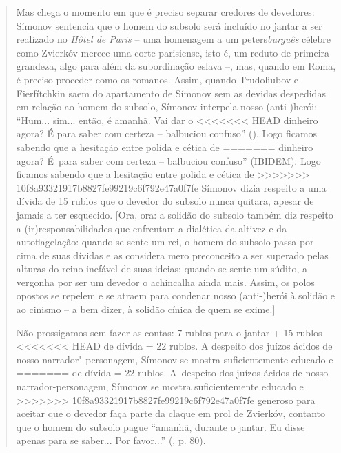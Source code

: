 {\begin{quote}
Mas chega o momento em que é preciso separar credores de devedores:
Símonov sentencia que o homem do subsolo será incluído no jantar a ser
realizado no \emph{Hôtel de Paris} -- uma homenagem a um
peters\emph{burguês} célebre como Zvierkóv merece uma corte parisiense,
isto é, um reduto de primeira grandeza, algo para além da subordinação
eslava --, mas, quando em Roma, é preciso proceder como os romanos.
Assim, quando Trudoliubov e Fierfítchkin saem do apartamento de Símonov
sem as devidas despedidas em relação ao homem do subsolo, Símonov
interpela nosso (anti-)herói: ``Hum... sim... então, é amanhã. Vai dar o
<<<<<<< HEAD
dinheiro agora? É para saber com certeza -- balbuciou confuso''
(). Logo ficamos sabendo que a hesitação entre polida e cética de
=======
dinheiro agora? É~para saber com certeza -- balbuciou confuso''
(IBIDEM). Logo ficamos sabendo que a hesitação entre polida e cética de
>>>>>>> 10f8a93321917b8827fe99219c6f792e47a0f7fe
Símonov dizia respeito a uma dívida de 15 rublos que o devedor do
subsolo nunca quitara, apesar de jamais a ter esquecido. {[}Ora, ora: a
solidão do subsolo também diz respeito a (ir)responsabilidades que
enfrentam a dialética da altivez e da autoflagelação: quando se sente um
rei, o homem do subsolo passa por cima de suas dívidas e as considera
mero preconceito a ser superado pelas alturas do reino inefável de suas
ideias; quando se sente um súdito, a vergonha por ser um devedor o
achincalha ainda mais. Assim, os polos opostos se repelem e se atraem
para condenar nosso (anti-)herói à solidão e ao cinismo -- a bem dizer,
à solidão cínica de quem se exime.{]}

Não prossigamos sem fazer as contas: 7 rublos para o jantar + 15 rublos
<<<<<<< HEAD
de dívida = 22 rublos. A despeito dos juízos ácidos de nosso
narrador"-personagem, Símonov se mostra suficientemente educado e
=======
de dívida = 22 rublos. A~despeito dos juízos ácidos de nosso
narrador-personagem, Símonov se mostra suficientemente educado e
>>>>>>> 10f8a93321917b8827fe99219c6f792e47a0f7fe
generoso para aceitar que o devedor faça parte da claque em prol de
Zvierkóv, contanto que o homem do subsolo pague ``amanhã, durante o
jantar. Eu disse apenas para se saber... Por favor...'' (, p. 80).


\end{quote}}
